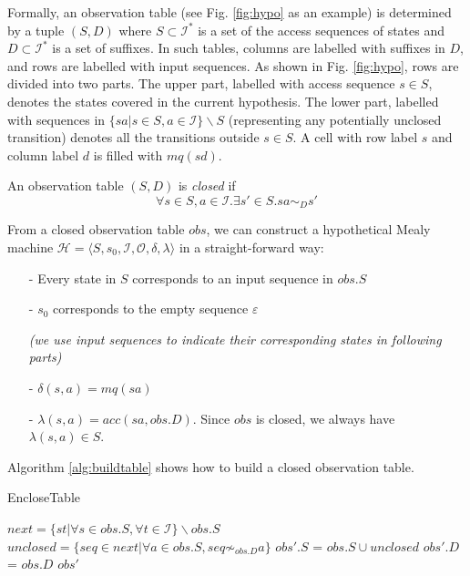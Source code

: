 \documentclass[conference, a4paper]{IEEEtran}
\begin{document}
Formally, an observation table (see Fig. \ref{fig:hypo} as an example) is determined by a tuple $(S,D)$ where
$S\subset\mathcal{I}^*$ is a set of the access sequences of states and $D\subset\mathcal{I}^*$
is a set of suffixes. In such tables, columns are labelled with suffixes in $D$, and rows are
labelled with input sequences. As shown in Fig. \ref{fig:hypo}, rows are divided into two parts. The upper
part, labelled with access sequence $s\in S$, denotes the states covered in the current hypothesis.
The lower part, labelled with sequences in $\{sa|s\in S,a\in\mathcal{I}\}\backslash S$ (representing
any potentially unclosed transition) denotes all the transitions outside $s\in S$. A cell with row
label $s$ and column label $d$ is filled with $mq(sd)$.

An observation table $(S,D)$ is \emph{closed} if 
\[
\forall s\in S,a\in\mathcal{I}.\exists s'\in S. sa\sim_D s'
\]

From a closed observation table $obs$, we can construct a hypothetical Mealy machine $\mathcal{H}=\langle
S,s_0,\mathcal{I},\mathcal{O},\delta,\lambda\rangle$ in a straight-forward way:
\begin{itemize}
  \item[-] Every state in $S$ corresponds to an input sequence in $obs.S$
  \item[-] $s_0$ corresponds to the empty sequence $\varepsilon$
    
    \emph{(we use input sequences to indicate their corresponding states in following parts)}
  \item[-] $\delta(s,a)=mq(sa)$
  \item[-] $\lambda(s,a)=acc(sa,obs.D)$. Since $obs$ is closed, we always have $\lambda(s,a)\in S$.
\end{itemize}

Algorithm \ref{alg:buildtable} shows how to build a closed observation table.

\begin{algorithm} 
  \caption{EncloseTable} 
  \label{alg:buildtable}
  \small
  {
    $next=\{st|\forall s\in obs.S,\forall t\in \mathcal{I}\}\backslash obs.S$\;
    $unclosed=\{seq\in next|\forall a\in obs.S, seq \not\sim_{obs.D} a\}$\;
    $obs'.S$ = $obs.S\cup unclosed$\;
    $obs'.D$ = $obs.D$\;
  }
  \Return $obs'$\; 
\end{algorithm}
\end{document}
